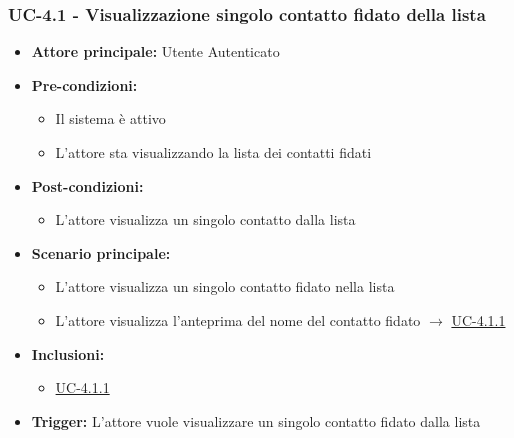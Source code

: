 \documentclass[a4paper,12pt]{article}
\begin{document}
\subsubsection{UC-4.1 - Visualizzazione singolo contatto fidato della lista} \label{subsec:UC-4.1}
\begin{itemize}
    \item \textbf{Attore principale:} Utente Autenticato
    \item \textbf{Pre-condizioni:} 
    \begin{itemize}
        \item Il sistema è attivo
        \item L'attore sta visualizzando la lista dei contatti fidati
    \end{itemize}
    \item \textbf{Post-condizioni:}
    \begin{itemize}
        \item L'attore visualizza un singolo contatto dalla lista
    \end{itemize}
    \item \textbf{Scenario principale:} 
    \begin{itemize}
        \item L'attore visualizza un singolo contatto fidato nella lista
        \item L'attore visualizza l'anteprima del nome del contatto fidato $\rightarrow$ \hyperref[subsec:UC-4.1.1]{UC-4.1.1}
    \end{itemize}
    \item \textbf{Inclusioni:}
    \begin{itemize}
        \item \hyperref[subsec:UC-4.1.1]{UC-4.1.1}
    \end{itemize}
    \item \textbf{Trigger:} L'attore vuole visualizzare un singolo contatto fidato dalla lista
\end{itemize}
\end{document}

